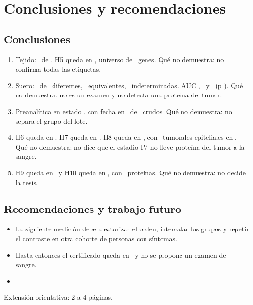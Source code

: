 \chapter{Conclusiones y recomendaciones}

\section{Conclusiones}
\begin{enumerate}
\item Tejido: \TejidoNum\ de \TejidoDen. H5 queda en \HcincoEstado, universo de \HcincoUniverso\ genes. Qué no demuestra: no confirma todas las etiquetas.
\item Suero: \SueroDif\ de \SueroN\ diferentes, \SueroEq\ equivalentes, \SueroInd\ indeterminadas. AUC \MlTodas, \MlCalidad\ y \MlSinCalidad\ (p \MlSinCalidadP). Qué no demuestra: no es un examen y no detecta una proteína del tumor.
\item Preanalítica en estado \PreEstado, con fecha en \PreFecha\ de \PreCrudos\ crudos. Qué no demuestra: no separa el grupo del lote.
\item H6 queda en \HseisEstado. H7 queda en \HsieteEstado. H8 queda en \HochoEstado, con \HochoTumorales\ tumorales epiteliales en \HochoUniverso. Qué no demuestra: no dice que el estadio IV no lleve proteína del tumor a la sangre.
\item H9 queda en \HnueveEstado\ y H10 queda en \HdiezEstado, con \HdiezN\ proteínas. Qué no demuestra: no decide la tesis.
\end{enumerate}

\section{Recomendaciones y trabajo futuro}
\begin{itemize}
\item La siguiente medición debe aleatorizar el orden, intercalar los grupos y repetir el contraste en otra cohorte de personas con síntomas.
\item Hasta entonces el certificado queda en \CertificadoEstado\ y no se propone un examen de sangre.
\item {}
\end{itemize}
Extensión orientativa: 2 a 4 páginas.
